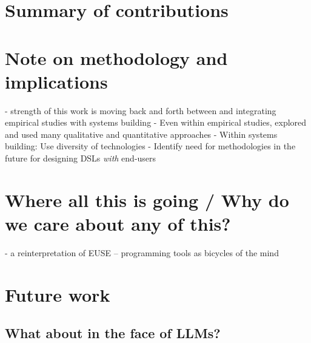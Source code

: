 \section{Summary of contributions}
\section{Note on methodology and implications}
- strength of this work is moving back and forth between and integrating empirical studies with systems building
- Even within empirical studies, explored and used many qualitative and quantitative approaches
- Within systems building: Use diversity of technologies
- Identify need for methodologies in the future for designing DSLs \textit{with} end-users
\section{Where all this is going / Why do we care about any of this?}
- a reinterpretation of EUSE -- programming tools as bicycles of the mind

\section{Future work}
\subsection{}
\subsection{What about in the face of LLMs?}
